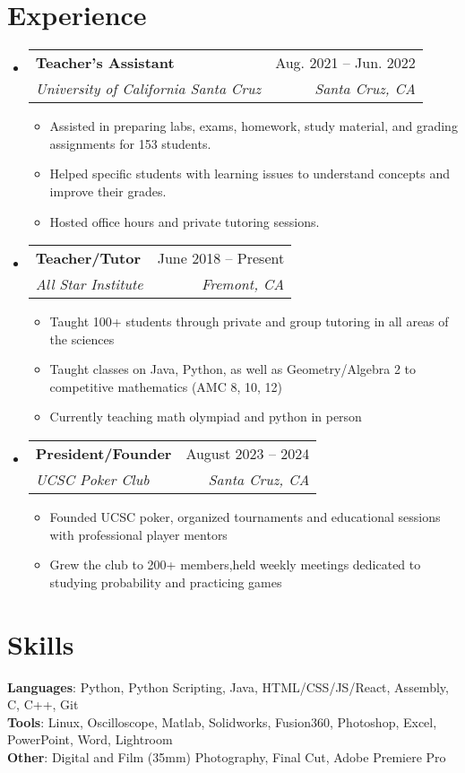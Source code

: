 \documentclass[letterpaper,11pt]{article}
\makeatletter
\newcommand{\resumeItem}[1]{
  \item\small{
    {#1 \vspace{-2pt}}
  }
}
\newcommand{\resumeSubheading}[4]{
  \vspace{-2pt}\item
    \begin{tabular*}{0.97\textwidth}[t]{l@{\extracolsep{\fill}}r}
      \textbf{#1} & #2 \\
      \textit{\small#3} & \textit{\small #4} \\
    \end{tabular*}\vspace{-7pt}
}
\newcommand{\resumeSubHeadingListStart}{\begin{itemize}[leftmargin=0.15in, label={}]}
\newcommand{\resumeSubHeadingListEnd}{\end{itemize}}
\newcommand{\resumeItemListStart}{\begin{itemize}}
\newcommand{\resumeItemListEnd}{\end{itemize}\vspace{-5pt}}
\makeatother
\begin{document}
\section{Experience}
  \resumeSubHeadingListStart
    \resumeSubheading
      {Teacher's Assistant}{Aug. 2021 -- Jun. 2022}
      {University of California Santa Cruz}{Santa Cruz, CA}
      \resumeItemListStart
        \resumeItem{Assisted in preparing labs, exams, homework, study material, and grading assignments for 153 students.}
        \resumeItem{Helped specific students with learning issues to understand concepts and improve their grades.}
        \resumeItem{Hosted office hours and private tutoring sessions.}
      \resumeItemListEnd
    \resumeSubheading
      {Teacher/Tutor}{June 2018 -- Present}
      {All Star Institute}{Fremont, CA}
      \resumeItemListStart
        \resumeItem{Taught 100+ students through private and group tutoring in all areas of the sciences}
        \resumeItem{Taught classes on Java, Python, as well as Geometry/Algebra 2 to competitive mathematics (AMC 8, 10, 12)}
        \resumeItem{Currently teaching math olympiad and python in person}
      \resumeItemListEnd
    \resumeSubheading
      {President/Founder}{August 2023 -- 2024}
      {UCSC Poker Club}{Santa Cruz, CA}
      \resumeItemListStart
        \resumeItem{Founded UCSC poker, organized tournaments and educational sessions with professional player mentors}
        \resumeItem{Grew the club to 200+ members,held weekly meetings dedicated to studying probability and practicing games}
      \resumeItemListEnd

  \resumeSubHeadingListEnd

\section{Skills}
 \begin{itemize}[leftmargin=0.15in, label={}]
    \small{\item{
     \textbf{Languages}{: Python, Python Scripting, Java, HTML/CSS/JS/React, Assembly, C, C++, Git} \\
     \textbf{Tools}{: Linux, Oscilloscope, Matlab, Solidworks, Fusion360, Photoshop, Excel, PowerPoint, Word, Lightroom} \\
     \textbf{Other}{: Digital and Film (35mm) Photography, Final Cut, Adobe Premiere Pro}
    }}
 \end{itemize}
\end{document}
